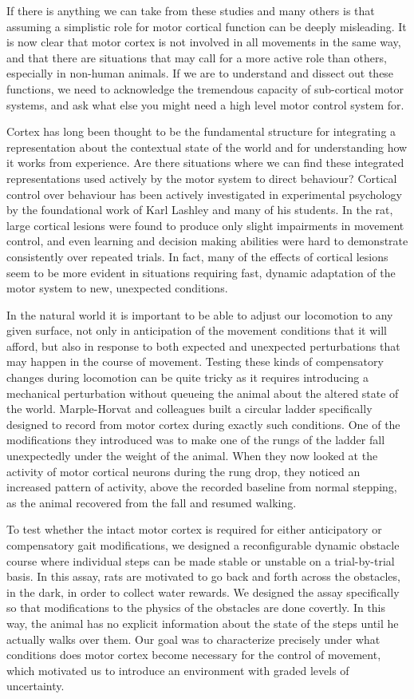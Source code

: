 If there is anything we can take from these studies and many others is that assuming a simplistic role for motor cortical function can be deeply misleading. It is now clear that motor cortex is not involved in all movements in the same way, and that there are situations that may call for a more active role than others, especially in non-human animals. If we are to understand and dissect out these functions, we need to acknowledge the tremendous capacity of sub-cortical motor systems, and ask what else you might need a high level motor control system for.

Cortex has long been thought to be the fundamental structure for integrating a representation about the contextual state of the world and for understanding how it works from experience. Are there situations where we can find these integrated representations used actively by the motor system to direct behaviour? Cortical control over behaviour has been actively investigated in experimental psychology by the foundational work of Karl Lashley and many of his students. In the rat, large cortical lesions were found to produce only slight impairments in movement control, and even learning and decision making abilities were hard to demonstrate consistently over repeated trials. In fact, many of the effects of cortical lesions seem to be more evident in situations requiring fast, dynamic adaptation of the motor system to new, unexpected conditions.

In the natural world it is important to be able to adjust our locomotion to any given surface, not only in anticipation of the movement conditions that it will afford, but also in response to both expected and unexpected perturbations that may happen in the course of movement. Testing these kinds of compensatory changes during locomotion can be quite tricky as it requires introducing a mechanical perturbation without queueing the animal about the altered state of the world. Marple-Horvat and colleagues built a circular ladder specifically designed to record from motor cortex during exactly such conditions. One of the modifications they introduced was to make one of the rungs of the ladder fall unexpectedly under the weight of the animal. When they now looked at the activity of motor cortical neurons during the rung drop, they noticed an increased pattern of activity, above the recorded baseline from normal stepping, as the animal recovered from the fall and resumed walking.

To test whether the intact motor cortex is required for either anticipatory or compensatory gait modifications, we designed a reconfigurable dynamic obstacle course where individual steps can be made stable or unstable on a trial-by-trial basis. In this assay, rats are motivated to go back and forth across the obstacles, in the dark, in order to collect water rewards. We designed the assay specifically so that modifications to the physics of the obstacles are done covertly. In this way, the animal has no explicit information about the state of the steps until he actually walks over them. Our goal was to characterize precisely under what conditions does motor cortex become necessary for the control of movement, which motivated us to introduce an environment with graded levels of uncertainty.

